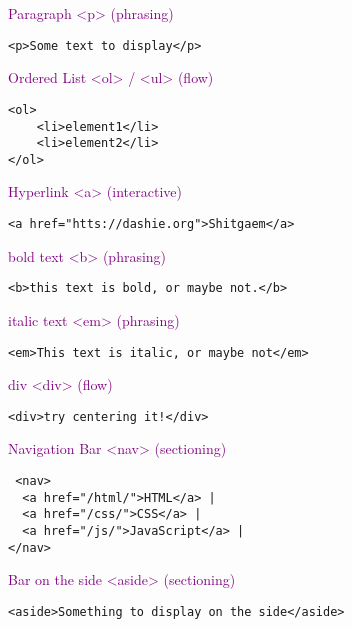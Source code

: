 \documentclass[main.tex,fontsize=6pt,paper=a4,paper=landscape,DIV=calc,]{scrartcl}
\begin{document}
\begin{multicols*}{4}
\textcolor{purple}{Paragraph <p> (phrasing)}
\vspace{-2mm}
\begin{lstlisting}
<p>Some text to display</p>
\end{lstlisting}
\vspace{2mm}

\textcolor{purple}{Ordered List <ol> / <ul> (flow)}
\vspace{-2mm}
\begin{lstlisting}
<ol>
    <li>element1</li>
    <li>element2</li>
</ol>
\end{lstlisting}
\vspace{2mm}

\textcolor{purple}{Hyperlink <a> (interactive)}
\vspace{-2mm}
\begin{lstlisting}
<a href="htts://dashie.org">Shitgaem</a>
\end{lstlisting}
\vspace{2mm}

\textcolor{purple}{bold text <b> (phrasing)}
\vspace{-2mm}
\begin{lstlisting}
<b>this text is bold, or maybe not.</b>
\end{lstlisting}
\vspace{2mm}

\textcolor{purple}{italic text <em> (phrasing)}
\vspace{-2mm}
\begin{lstlisting}
<em>This text is italic, or maybe not</em>
\end{lstlisting}
\vspace{2mm}

\textcolor{purple}{div <div> (flow)}
\vspace{-2mm}
\begin{lstlisting}
<div>try centering it!</div>
\end{lstlisting}
\vspace{2mm}

\textcolor{purple}{Navigation Bar <nav> (sectioning)}
\vspace{-2mm}
\begin{lstlisting}
 <nav>
  <a href="/html/">HTML</a> |
  <a href="/css/">CSS</a> |
  <a href="/js/">JavaScript</a> |
</nav>
\end{lstlisting}
\vspace{2mm}

\textcolor{purple}{Bar on the side <aside> (sectioning)}
\vspace{-2mm}
\begin{lstlisting}
<aside>Something to display on the side</aside>
\end{lstlisting}
\vspace{2mm}


\end{multicols*}
\end{document}
